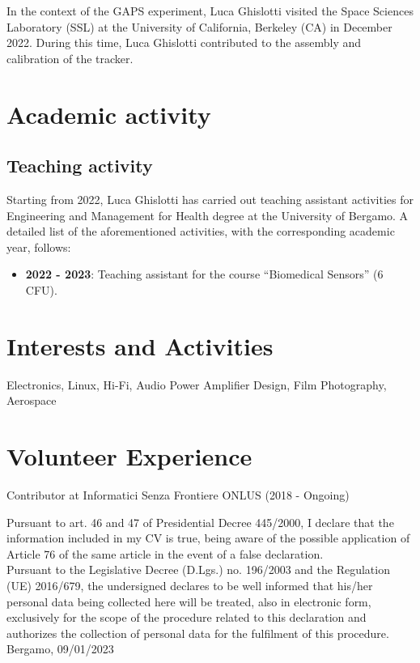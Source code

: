 \documentclass[11pt]{article}
\begin{document}
\noindent
In the context of the GAPS experiment, Luca Ghislotti visited the Space Sciences Laboratory (SSL) at the University of California, Berkeley (CA) in December 2022. During this time, Luca Ghislotti contributed to the assembly and calibration of the tracker.

\bigskip
\section*{Academic activity}
\subsection*{Teaching activity}
Starting from 2022, Luca Ghislotti has carried out teaching assistant activities for Engineering and Management for Health degree at the University of Bergamo. A detailed list of the aforementioned activities, with the corresponding academic year, follows:\\

\vspace{-0.5em}
\begin{itemize}
	\item \textbf{2022 - 2023}: Teaching assistant for the course “Biomedical Sensors” (6 CFU).
\end{itemize}


\bigskip
\section*{Interests and Activities}
Electronics, Linux, Hi-Fi,  Audio Power Amplifier Design, Film Photography, Aerospace

\bigskip
\section*{Volunteer Experience}
Contributor at Informatici Senza Frontiere ONLUS (2018 - Ongoing)

\vspace{1cm}
\noindent
Pursuant to art. 46 and 47 of Presidential Decree 445/2000, I declare that the information included in my CV is true, being aware of the possible application of Article 76 of the same article in the event of a false declaration.\\
Pursuant to the Legislative Decree (D.Lgs.) no. 196/2003 and the Regulation (UE) 2016/679, the undersigned declares to be well informed that his/her personal data being collected here will be treated, also in electronic form, exclusively for the scope of the procedure related to this declaration and authorizes the collection of personal data for the fulfilment of this procedure.\\

\bigskip
Bergamo, 09/01/2023
\vspace{1cm}
\end{document}
